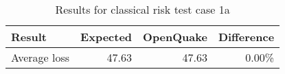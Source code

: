 \begin{table}[htbp]

\centering
\begin{tabular}{ l r r r }

\hline
\rowcolor{anti-flashwhite}
\bf{Result} & \bf{Expected} & \bf{OpenQuake} & \bf{Difference}\\
\hline
Average loss & 47.63 & 47.63 & 0.00\% \\
\hline
\end{tabular}

\caption{Results for classical risk test case 1a}
\label{tab:result-cr-1a}
\end{table}